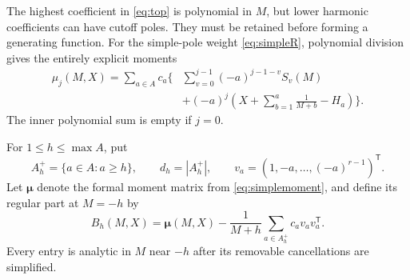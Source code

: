 \documentclass[11pt,letterpaper]{article}
\numberwithin{equation}{section}
\theoremstyle{definition}\newtheorem{definition}[theorem]{Definition}
\theoremstyle{remark}\newtheorem{remark}[theorem]{Remark}
\begin{document}
The highest coefficient in \eqref{eq:top} is polynomial in $M$, but
lower harmonic coefficients can have cutoff poles. They must be
retained before forming a generating function. For the simple-pole
weight \eqref{eq:simpleR}, polynomial division gives the entirely
explicit moments
\begin{equation}\label{eq:simplemoment}
 \begin{split}
 \mu_j(M,X)=\sum_{a\in A}c_a\bigg\{&
  \sum_{v=0}^{j-1}(-a)^{j-1-v}S_v(M)\\
 &+(-a)^j\left(X+\sum_{b=1}^a\frac1{M+b}-H_a\right)\bigg\}.
 \end{split}
\end{equation}
The inner polynomial sum is empty if $j=0$.

For $1\le h\le\max A$, put
\[
 A_h^+=\{a\in A:a\ge h\},\qquad d_h=|A_h^+|,
 \qquad v_a=(1,-a,\ldots,(-a)^{r-1})^{\mathsf T}.
\]
Let $\boldsymbol\mu$ denote the formal moment matrix from
\eqref{eq:simplemoment}, and define its regular part at $M=-h$ by
\begin{equation}\label{eq:regularmatrix}
 B_h(M,X)=\boldsymbol\mu(M,X)-\frac1{M+h}
                         \sum_{a\in A_h^+}c_av_av_a^{\mathsf T}.
\end{equation}
Every entry is analytic in $M$ near $-h$ after its removable
cancellations are simplified.
\end{document}
